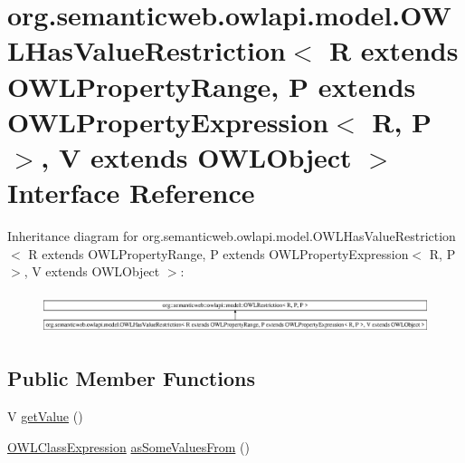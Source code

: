\hypertarget{interfaceorg_1_1semanticweb_1_1owlapi_1_1model_1_1_o_w_l_has_value_restriction_3_01_r_01extends_ddd6bdb2056f68eb0b170ea0a444249e}{\section{org.\-semanticweb.\-owlapi.\-model.\-O\-W\-L\-Has\-Value\-Restriction$<$ R extends O\-W\-L\-Property\-Range, P extends O\-W\-L\-Property\-Expression$<$ R, P $>$, V extends O\-W\-L\-Object $>$ Interface Reference}
\label{interfaceorg_1_1semanticweb_1_1owlapi_1_1model_1_1_o_w_l_has_value_restriction_3_01_r_01extends_ddd6bdb2056f68eb0b170ea0a444249e}
}
Inheritance diagram for org.\-semanticweb.\-owlapi.\-model.\-O\-W\-L\-Has\-Value\-Restriction$<$ R extends O\-W\-L\-Property\-Range, P extends O\-W\-L\-Property\-Expression$<$ R, P $>$, V extends O\-W\-L\-Object $>$\-:\begin{figure}[H]
\begin{center}
\leavevmode
\includegraphics[height=1.204301cm]{interfaceorg_1_1semanticweb_1_1owlapi_1_1model_1_1_o_w_l_has_value_restriction_3_01_r_01extends_ddd6bdb2056f68eb0b170ea0a444249e}
\end{center}
\end{figure}
\subsection*{Public Member Functions}
\begin{DoxyCompactItemize}
\item 
V \hyperlink{interfaceorg_1_1semanticweb_1_1owlapi_1_1model_1_1_o_w_l_has_value_restriction_3_01_r_01extends_ddd6bdb2056f68eb0b170ea0a444249e_aabc1b5cc0f7a325d25e9f3f97c73eff9}{get\-Value} ()
\item 
\hyperlink{interfaceorg_1_1semanticweb_1_1owlapi_1_1model_1_1_o_w_l_class_expression}{O\-W\-L\-Class\-Expression} \hyperlink{interfaceorg_1_1semanticweb_1_1owlapi_1_1model_1_1_o_w_l_has_value_restriction_3_01_r_01extends_ddd6bdb2056f68eb0b170ea0a444249e_a63444e207d99adbc6c84cb954ef4d79e}{as\-Some\-Values\-From} ()
\end{DoxyCompactItemize}


